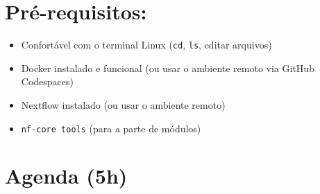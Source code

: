 \documentclass[
  brazilian,
  letterpaper,
  DIV=11,
  numbers=noendperiod]{scrreprt}
\providecommand{\tightlist}{%
  \setlength{\itemsep}{0pt}\setlength{\parskip}{0pt}}
\begin{document}

\chapter{Pré-requisitos:}\label{pruxe9-requisitos}

\begin{itemize}
\tightlist
\item
  Confortável com o terminal Linux (\texttt{cd}, \texttt{ls}, editar
  arquivos)
\item
  Docker instalado e funcional (ou usar o ambiente remoto via GitHub
  Codespaces)
\item
  Nextflow instalado (ou usar o ambiente remoto)
\item
  \texttt{nf-core\ tools} (para a parte de módulos)
\end{itemize}


\chapter{Agenda (5h)}\label{agenda-5h}
\end{document}
